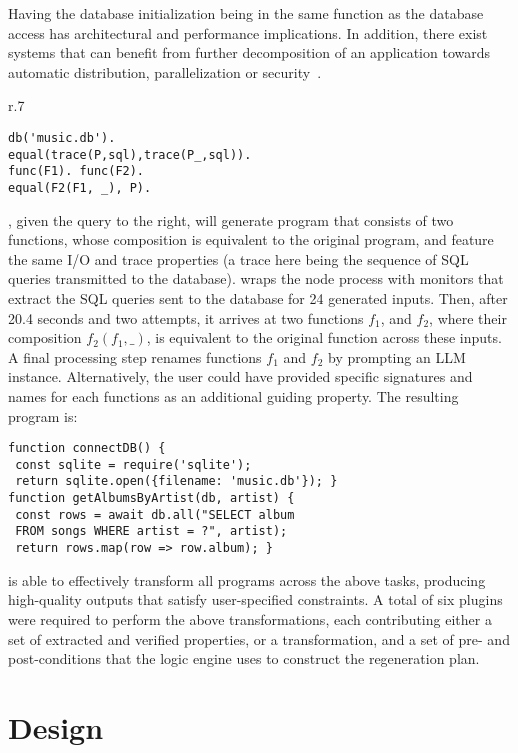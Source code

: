 \documentclass[a4paper,twoside,12pt]{report} %
\begin{document}
Having the database initialization being in the same function as 
the database access has architectural and performance implications.
In addition, there exist systems that can benefit from further decomposition
of an application towards automatic distribution, parallelization or security~\cite{Towards_Modern_Ghemaw_2023, vasilakis2019ignis, vasilakis2018breakapp}.
\begin{wrapfigure}[5]{r}{.7\columnwidth}
  \vspace{-10pt}
  \begin{verbatim}
db('music.db').
equal(trace(P,sql),trace(P_,sql)).
func(F1). func(F2).
equal(F2(F1, _), P).
\end{verbatim}
\end{wrapfigure}
\sys, given the query to the right, will 
generate program that consists of two functions,
whose composition is equivalent to the original program, and feature 
the same I/O and trace properties (a trace here being the sequence of SQL 
queries transmitted to the database).
\sys wraps the node process with monitors that extract the SQL queries 
sent to the database for 24 generated inputs.
Then, after 20.4 seconds and two attempts, it arrives at two functions $f_1$, and 
$f_2$, where their composition $f_2(f_1, \_)$, is equivalent to the original  function across these inputs.
A final processing step renames functions $f_1$ and $f_2$ by prompting an LLM instance.
Alternatively, the user could have provided specific signatures and names for each 
functions as an additional guiding property.
The resulting program is:
\begin{verbatim}
function connectDB() {
 const sqlite = require('sqlite');
 return sqlite.open({filename: 'music.db'}); }
function getAlbumsByArtist(db, artist) {
 const rows = await db.all("SELECT album
 FROM songs WHERE artist = ?", artist);
 return rows.map(row => row.album); }
\end{verbatim}

\sys is able to effectively transform all programs across the above tasks,
producing high-quality outputs that satisfy user-specified constraints. A total
of six plugins were required to perform the above transformations, each
contributing either a set of extracted and verified properties, or a
transformation, and a set of pre- and post-conditions that the logic engine
uses to construct the regeneration plan.

\chapter{\sys Design}
\label{sec:design}
\end{document}

